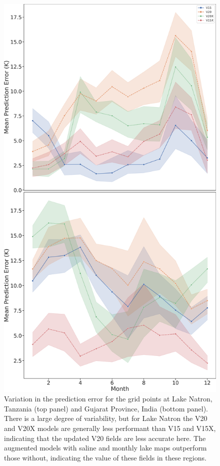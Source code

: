 \documentclass[hess, twostagejnl]{copernicus}
\begin{document}
	\begin{figure}
	\includegraphics[scale=0.2]{stacked_timeseries_lakes_new.png}
	\caption{Variation in the prediction error for the grid points at Lake Natron, Tanzania (top panel) and Gujarat Province, India (bottom panel). There is a large degree of variability, but for Lake Natron the V20 and V20X models are generally less performant than V15 and V15X, indicating that the updated V20 fields are less accurate here. The augmented models with saline and monthly lake maps outperform those without, indicating the value of these fields in these regions.} 
	\label{fig:timeseries_stacked}
\end{figure}
\end{document}
